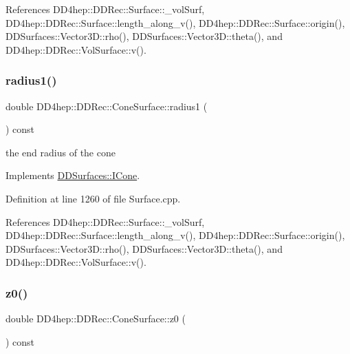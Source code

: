 References D\+D4hep\+::\+D\+D\+Rec\+::\+Surface\+::\+\_\+vol\+Surf, D\+D4hep\+::\+D\+D\+Rec\+::\+Surface\+::length\+\_\+along\+\_\+v(), D\+D4hep\+::\+D\+D\+Rec\+::\+Surface\+::origin(), D\+D\+Surfaces\+::\+Vector3\+D\+::rho(), D\+D\+Surfaces\+::\+Vector3\+D\+::theta(), and D\+D4hep\+::\+D\+D\+Rec\+::\+Vol\+Surface\+::v().

\hypertarget{class_d_d4hep_1_1_d_d_rec_1_1_cone_surface_aab661bae81017ac8df1914910b1e0bb5}{}\label{class_d_d4hep_1_1_d_d_rec_1_1_cone_surface_aab661bae81017ac8df1914910b1e0bb5} 
\subsubsection{\texorpdfstring{radius1()}{radius1()}}
{\footnotesize\ttfamily double D\+D4hep\+::\+D\+D\+Rec\+::\+Cone\+Surface\+::radius1 (\begin{DoxyParamCaption}{ }\end{DoxyParamCaption}) const\hspace{0.3cm}{\ttfamily [virtual]}}



the end radius of the cone 



Implements \hyperlink{class_d_d_surfaces_1_1_i_cone_a58fb9fc961cc2580a6cc1d5fda4d817e}{D\+D\+Surfaces\+::\+I\+Cone}.



Definition at line 1260 of file Surface.\+cpp.



References D\+D4hep\+::\+D\+D\+Rec\+::\+Surface\+::\+\_\+vol\+Surf, D\+D4hep\+::\+D\+D\+Rec\+::\+Surface\+::length\+\_\+along\+\_\+v(), D\+D4hep\+::\+D\+D\+Rec\+::\+Surface\+::origin(), D\+D\+Surfaces\+::\+Vector3\+D\+::rho(), D\+D\+Surfaces\+::\+Vector3\+D\+::theta(), and D\+D4hep\+::\+D\+D\+Rec\+::\+Vol\+Surface\+::v().

\hypertarget{class_d_d4hep_1_1_d_d_rec_1_1_cone_surface_a0bb598e6dcf760916f657335a4b34455}{}\label{class_d_d4hep_1_1_d_d_rec_1_1_cone_surface_a0bb598e6dcf760916f657335a4b34455} 
\subsubsection{\texorpdfstring{z0()}{z0()}}
{\footnotesize\ttfamily double D\+D4hep\+::\+D\+D\+Rec\+::\+Cone\+Surface\+::z0 (\begin{DoxyParamCaption}{ }\end{DoxyParamCaption}) const\hspace{0.3cm}{\ttfamily [virtual]}}



